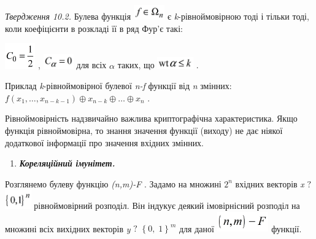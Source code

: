 \textit{Твердження 10.2}\textit{. }Булева функція 
\includegraphics[width=0.528in,height=0.25in]{crypt-img/crypt-img203.png}  є
\textit{k}{}-рівноймовірною\textit{ }тоді і тільки тоді, коли коефіцієнти в
розкладі її в ряд Фур’є такі:

{\centering
 \includegraphics[width=0.5138in,height=0.4307in]{crypt-img/crypt-img204.png} , 
 \includegraphics[width=0.5138in,height=0.25in]{crypt-img/crypt-img205.png} 
для всіх  ${\alpha }$\textit{ }таких, що 
\includegraphics[width=0.611in,height=0.1937in]{crypt-img/crypt-img206.png} .
\par}

Приклад \textit{k}{}-рівноймовірної булевої\textit{
}\textit{n}\textit{{}-}\textit{f}  функції від \textit{n}\textit{ }змінних: 
${f(x_{{1}},\dots,x_{{n-k-1}}){\oplus}x_{{n-k}}{\oplus}\dots{\oplus}x_{{n}}}$
.

Рівноймовірність надзвичайно важлива криптографічна характеристика. Якщо функція
рівноймовірна, то знання значення функції  (виходу) не дає ніякої додаткової
інформації про значення вхідних змінних.  


\bigskip

\liststyleWWviiiNumxxix
\setcounter{saveenum}{\value{enumi}}
\begin{enumerate}
\setcounter{enumi}{\value{saveenum}}
\item {\bfseries\itshape
Кореляційний імунітет.}
\end{enumerate}
Розглянемо булеву функцію
\textit{(}\textit{n}\textit{,}\textit{m}\textit{)-}\textit{F}  . Задамо на
множині  ${2^{{n}}}$ вхідних векторів \textit{x} ${?}$
\includegraphics[width=0.4437in,height=0.3193in]{crypt-img/crypt-img207.png} 
рівноймовірний розподіл. Він індукує деякий імовірнісний розподіл на множині
всіх вихідних векторів \textit{y} ${?}$ ${\left\{0,\;1\right\}^{{m}}}$ для
даної 
\includegraphics[width=0.8744in,height=0.3425in]{crypt-img/crypt-img208.png} 
функції.

